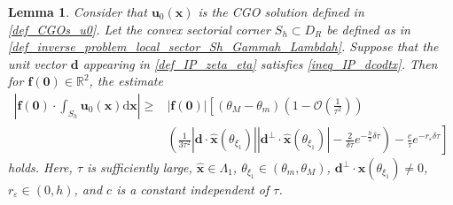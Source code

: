 \documentclass[11pt,reqno,oneside]{amsart}
\newtheorem{lemma}{Lemma}[section]
\theoremstyle{definition}
\theoremstyle{remark}
\numberwithin{equation}{section}
\numberwithin{equation}{section}
\theoremstyle{remark}
\begin{document}
\begin{lemma} \label{lem_IP_est_f0_int_Sh_u0}
	Consider that $ \mathbf{u}_0\left(\mathbf{x}\right) $ is the CGO solution defined in \eqref{def_CGOs_u0}. Let the convex sectorial corner $ S_h\subset D_R $ be defined as in \eqref{def_inverse_problem_local_sector_Sh_Gammah_Lambdah}. Suppose that the unit vector $ \mathbf{d} $ appearing in \eqref{def_IP_zeta_eta} satisfies \eqref{ineq_IP_dcodtx}. Then for $ \mathbf{f}\left(\bm{0}\right) \in \mathbb{R}^2 $, the estimate
	\begin{align*} 
		\left| \mathbf{f}\left(\bm{0}\right) \cdot \int_{S_h} \mathbf{u}_0\left(\mathbf{x}\right) \mathrm{d}\mathbf{x} \right| \geqslant & \left| \mathbf{f}\left(\bm{0}\right) \right| \left[\left(\theta_M-\theta_m\right)\left(1-\mathcal{O}\left(\frac{1}{\tau^2}\right)\right) \right. \\
		& \left.\left(\frac{1}{3 \tau^2}\left|\mathbf{d}\cdot\hat{\mathbf{x}} \left(\theta_{\xi_1}\right)\right| \left|\mathbf{d}^{\perp}\cdot\hat{\mathbf{x}} \left(\theta_{\xi_1}\right)\right| - \frac{2}{\delta\tau} e^{-\frac{h}{2} \delta \tau}\right) - \frac{c}{\tau}e^{-r_{\varepsilon} \delta \tau}\right] 
	\end{align*}
	holds. Here, $ \tau $ is sufficiently large, $ \hat{\mathbf{x}} \in \Lambda_1 $, $ \theta_{\xi_1} \in \left(\theta_m, \theta_M\right) $, $ \mathbf{d}^{\perp}\cdot\hat{\mathbf{x}} \left(\theta_{\xi_1}\right) \neq 0 $, $ r_{\varepsilon}\in\left(0,h\right) $, and $ c $ is a constant independent of $ \tau $.
\end{lemma}
\end{document}
